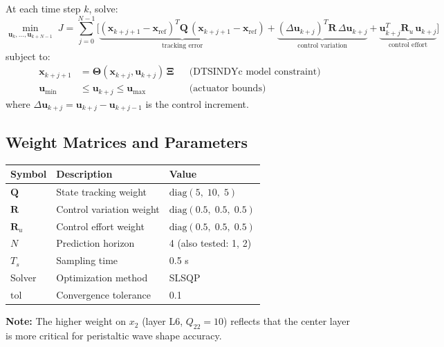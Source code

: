 \documentclass[11pt,a4paper]{article}
\begin{document}
\begin{equationbox}
At each time step $k$, solve:
\begin{equation}
    \min_{\mathbf{u}_k, \ldots, \mathbf{u}_{k+N-1}} \; J = \sum_{j=0}^{N-1} \Big[
        \underbrace{(\mathbf{x}_{k+j+1} - \mathbf{x}_{\text{ref}})^T \mathbf{Q}\, (\mathbf{x}_{k+j+1} - \mathbf{x}_{\text{ref}})}_{\text{tracking error}}
    + \underbrace{(\Delta\mathbf{u}_{k+j})^T \mathbf{R}\, \Delta\mathbf{u}_{k+j}}_{\text{control variation}}
    + \underbrace{\mathbf{u}_{k+j}^T \mathbf{R}_u\, \mathbf{u}_{k+j}}_{\text{control effort}}
    \Big]
    \label{eq:mpc_cost}
\end{equation}
subject to:
\begin{align}
    \mathbf{x}_{k+j+1} &= \bm{\Theta}(\mathbf{x}_{k+j}, \mathbf{u}_{k+j})\,\bm{\Xi}
    && \text{(DTSINDYc model constraint)} \label{eq:mpc_dynamics} \\
    \mathbf{u}_{\min} &\leq \mathbf{u}_{k+j} \leq \mathbf{u}_{\max}
    && \text{(actuator bounds)} \label{eq:mpc_bounds}
\end{align}
where $\Delta\mathbf{u}_{k+j} = \mathbf{u}_{k+j} - \mathbf{u}_{k+j-1}$ is the control increment.
\end{equationbox}

\subsection{Weight Matrices and Parameters}

\begin{equationbox}
\begin{center}
\begin{tabular}{lll}
\toprule
\textbf{Symbol} & \textbf{Description} & \textbf{Value} \\
\midrule
$\mathbf{Q}$ & State tracking weight & $\text{diag}(5,\; 10,\; 5)$ \\
$\mathbf{R}$ & Control variation weight & $\text{diag}(0.5,\; 0.5,\; 0.5)$ \\
$\mathbf{R}_u$ & Control effort weight & $\text{diag}(0.5,\; 0.5,\; 0.5)$ \\
$N$ & Prediction horizon & 4 (also tested: 1, 2) \\
$T_s$ & Sampling time & 0.5 s \\
Solver & Optimization method & SLSQP \\
$\text{tol}$ & Convergence tolerance & 0.1 \\
\bottomrule
\end{tabular}
\end{center}

\textbf{Note:} The higher weight on $x_2$ (layer L6, $Q_{22}=10$) reflects that the
center layer is more critical for peristaltic wave shape accuracy.
\end{equationbox}
\end{document}

